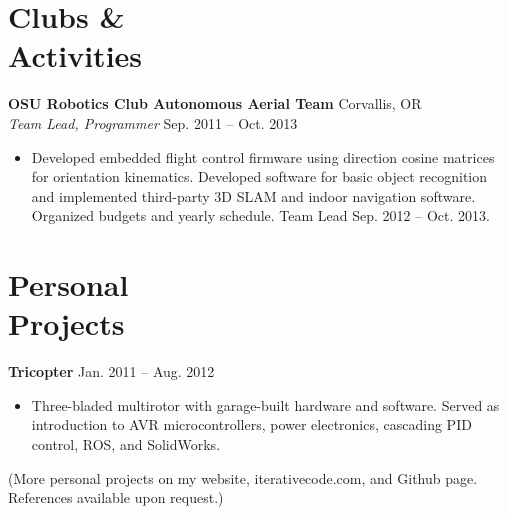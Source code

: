 \documentclass[10pt,letterpaper,margin]{res}
\begin{document}
\begin{resume}
\section{Clubs \& \\ Activities}

{\bf OSU Robotics Club Autonomous Aerial Team} \hfill {\color{lightgray} Corvallis, OR} \\
{\it Team Lead, Programmer} \hfill {\color{lightgray} Sep. 2011 -- Oct. 2013}\vspace{0.2em}

\begin{itemize}
	\item Developed embedded flight control firmware using direction cosine
		matrices for orientation kinematics. Developed software for basic
		object recognition and implemented third-party 3D SLAM and indoor
		navigation software. Organized budgets and yearly schedule. Team Lead
		Sep. 2012 -- Oct. 2013.
\end{itemize}



\section{Personal \\ Projects}

{\bf Tricopter} \hfill {\color{lightgray} Jan. 2011 -- Aug. 2012}\vspace{0.2em}

\begin{itemize}
	\item Three-bladed multirotor with garage-built hardware and software.
		Served as introduction to AVR microcontrollers, power electronics,
		cascading PID control, ROS, and SolidWorks.
\end{itemize}

{\footnotesize (More personal projects on my website, iterativecode.com, and
Github page. References available upon request.)}


% 

\end{resume}
\end{document}
